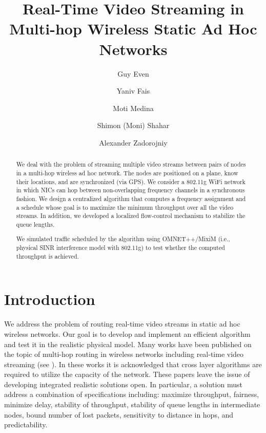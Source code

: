 \documentclass[12pt]{article}
\newenvironment{proof sketch}[1]{\noindent {\emph{Proof sketch of #1:}}}{\hfill \qed}
\begin{document}
\title{Real-Time Video Streaming in Multi-hop Wireless Static Ad Hoc Networks}


\author{%
Guy Even
\and
Yaniv Fais
\and
Moti Medina
%
\and Shimon (Moni) Shahar
\and Alexander Zadorojniy}

\date{}

\maketitle



\begin{abstract}
  We deal with the problem of streaming multiple video streams between
  pairs of nodes in a multi-hop wireless ad hoc network.  The nodes
  are positioned on a plane, know their locations, and are
  synchronized (via GPS). We consider a 802.11g WiFi network in which
  NICs can hop between non-overlapping frequency channels in a
  synchronous fashion. We design a centralized algorithm that computes
  a frequency assignment and a schedule whose goal is to maximize the
  minimum throughput over all the video streams.  In addition, we
  developed a localized flow-control mechanism to stabilize the queue
  lengths.

  We simulated traffic scheduled by the algorithm using OMNET++/MixiM
  (i.e., physical SINR interference model with 802.11g) to test
  whether the computed throughput is achieved.
\end{abstract}

\section{Introduction}

We address the problem of routing real-time video streams in static ad
hoc wireless networks.  Our goal is to develop and implement an
efficient algorithm and test it in the realistic physical model.  Many
works have been published on the topic of multi-hop routing in
wireless networks including real-time video streaming (see
\cite{setton2005cross,khan2006application,shan2005cross,van2005cross}).
In these works it is acknowledged that cross layer algorithms are
required to utilize the capacity of the network.  These papers leave
the issue of developing integrated realistic solutions open. In
particular, a solution must address a combination of specifications
including: maximize throughput, fairness, minimize delay, stability of
throughput, stability of queue lengths in intermediate nodes, bound number of lost
packets, sensitivity to distance in hops, and predictability.
\end{document}
